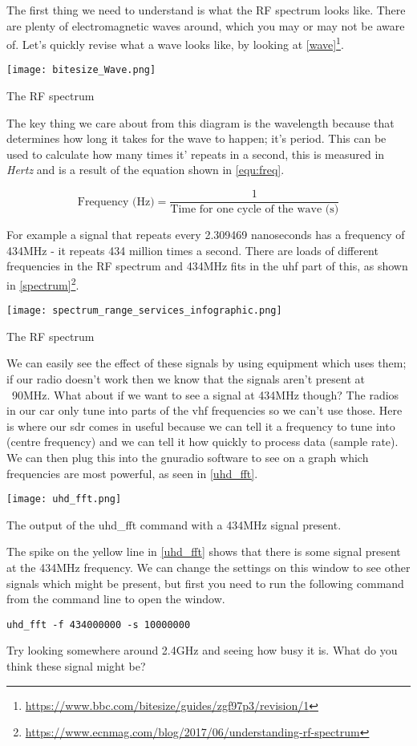 The first thing we need to understand is what the \gls{RF} spectrum looks like. There are plenty of electromagnetic waves around, which you may or may not be aware of. Let's quickly revise what a wave looks like, by looking at \cref{wave}\footnote{\url{https://www.bbc.com/bitesize/guides/zgf97p3/revision/1}}.

\centrefigurestart
\texttt{[image: bitesize\_Wave.png]}
\caption{The RF spectrum}
\label{wave}
\centrefigureend

The key thing we care about from this diagram is the wavelength because that determines how long it takes for the wave to happen; it's period. This can be used to calculate how many times it' repeats in a second, this is measured in \textit{Hertz} and is a result of the equation shown in \cref{equ:freq}. 

\begin{equation}
\text{Frequency (Hz)} = \frac{1}{\text{Time for one cycle of the wave (s)}}
\label{equ:freq}
\end{equation}

For example a signal that repeats every 2.309469 nanoseconds has a frequency of 434MHz - it repeats 434 million times a second. There are loads of different frequencies in the \gls{RF} spectrum and 434MHz fits in the \gls{uhf} part of this, as shown in \cref{spectrum}\footnote{\url{https://www.ecnmag.com/blog/2017/06/understanding-rf-spectrum}}.

\centrefigurestart
\texttt{[image: spectrum\_range\_services\_infographic.png]}
\caption{The RF spectrum}
\label{spectrum}
\centrefigureend

We can easily see the effect of these signals by using equipment which uses them; if our radio doesn't work then we know that the signals aren't present at ~90MHz. What about if we want to see a signal at 434MHz though? The radios in our car only tune into parts of the \gls{vhf} frequencies so we can't use those. Here is where our \gls{sdr} comes in useful because we can tell it a frequency to tune into (centre frequency) and we can tell it how quickly to process data (sample rate). We can then plug this into the gnuradio software to see on a graph which frequencies are most powerful, as seen in \cref{uhd_fft}.

\centrefigurestart
\texttt{[image: uhd\_fft.png]}
\caption{The output of the uhd\_fft command with a 434MHz signal present.}
\label{uhd_fft}
\centrefigureend

The spike on the yellow line in \cref{uhd_fft} shows that there is some signal present at the 434MHz frequency. We can change the settings on this window to see other signals which might be present, but first you need to run the following command from the command line to open the window.
\begin{lstlisting}
uhd_fft -f 434000000 -s 10000000
\end{lstlisting}
Try looking somewhere around 2.4GHz and seeing how busy it is. What do you think these signal might be?

